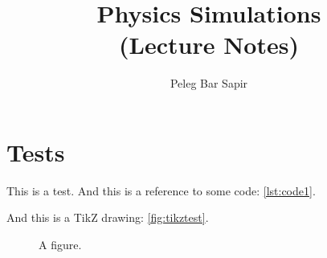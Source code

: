 \documentclass[a4paper, twoside, symmetric, nobib, nohyper]{tufte-book}
\title{Physics Simulations\\(Lecture Notes)}
\author{Peleg Bar Sapir}
\begin{document}
\maketitle

\ifdefined\testcode
  \section{Tests}
  This is a test. And this is a reference to some code: \autoref{lst:code1}.
  

  And this is a TikZ drawing: \autoref{fig:tikztest}.

  \begin{figure}
      \begin{center}
      \end{center}
    \caption{A figure.}\label{fig:tikztest}
  \end{figure}
  
\else
\fi






\end{document}
